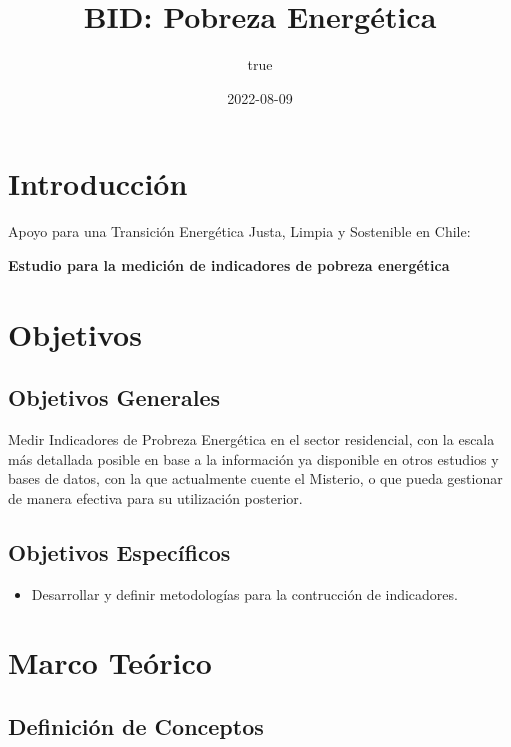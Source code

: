 \documentclass[
]{book}
\title{BID: Pobreza Energética}
\author{true}
\date{2022-08-09}
\providecommand{\tightlist}{%
  \setlength{\itemsep}{0pt}\setlength{\parskip}{0pt}}
\begin{document}
\maketitle

{
\setcounter{tocdepth}{1}
\tableofcontents
}
\hypertarget{introducciuxf3n}{%
\chapter{Introducción}\label{introducciuxf3n}}

Apoyo para una Transición Energética Justa, Limpia y Sostenible en Chile:

\textbf{Estudio para la medición de indicadores de pobreza energética}

\hypertarget{objetivos}{%
\chapter{Objetivos}\label{objetivos}}

\hypertarget{objetivos-generales}{%
\section{Objetivos Generales}\label{objetivos-generales}}

Medir Indicadores de Probreza Energética en el sector residencial, con la escala más detallada posible en base a la información ya disponible en otros estudios y bases de datos, con la que actualmente cuente el Misterio, o que pueda gestionar de manera efectiva para su utilización posterior.

\hypertarget{objetivos-especuxedficos}{%
\section{Objetivos Específicos}\label{objetivos-especuxedficos}}

\begin{itemize}
\tightlist
\item
  Desarrollar y definir metodologías para la contrucción de indicadores.
\end{itemize}

\hypertarget{m_teorico}{%
\chapter{Marco Teórico}\label{m_teorico}}

\hypertarget{definiciuxf3n-de-conceptos}{%
\section{Definición de Conceptos}\label{definiciuxf3n-de-conceptos}}
\end{document}

